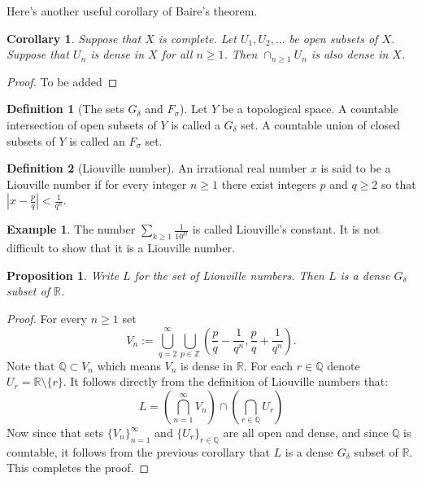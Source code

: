 \documentclass[11pt,a4paper]{article}
\theoremstyle{definition}
\newtheorem{definition}{Definition}[section]
\newtheorem{example}{Example}[section]
\theoremstyle{plain}
\newtheorem{proposition}[theorem]{Proposition}
\newtheorem{corollary}[theorem]{Corollary}
\newcommand{\Z}{\mathbb{Z}}
\newcommand{\Q}{\mathbb{Q}}
\newcommand{\R}{\mathbb{R}}
\newcommand{\abs}[1]{\left\lvert #1\right\rvert}
\begin{document}
  Here's another useful corollary of Baire's theorem.
  
  \begin{corollary}
    Suppose that $X$ is complete. Let $U_1,U_2,\dots$ be open subsets of $X$.
    Suppose that $U_n$ is dense in $X$ for all $n \geq 1$. Then 
    $\cap_{n \geq 1}{U_n}$ is also dense in $X$.
  \end{corollary}
  \begin{proof}
    To be added
  \end{proof}
  
  \begin{definition}[The sets $G_\delta$ and $F_\sigma$]
    Let $Y$ be a topological space. A countable intersection of open
    subsets of $Y$ is called a $G_\delta$ set. A countable union of closed 		
    subsets of $Y$ is called an $F_\sigma$ set.
  \end{definition}

  \begin{definition}[Liouville number]
    An irrational real number $x$ is said to be a Liouville number if
    for every integer $n \geq 1$ there exist integers $p$ and $q \geq 2$ 
    so that $\abs{x - \frac{p}{q}} < \frac{1}{q^n}$.
  \end{definition}

  \begin{example}
    The number $\sum_{k \geq 1}{\frac{1}{10^{k!}}}$ is called Liouville’s 
    constant. It is not difficult to show that it is a Liouville number.
  \end{example}

  \begin{proposition}
    Write $L$ for the set of Liouville numbers. Then $L$ is a dense
    $G_\delta$ subset of $\R$.
  \end{proposition}
  \begin{proof}
    For every $n \geq 1$ set
    \[
      V_n := \bigcup_{q=2}^{\infty} \bigcup_{p \in \Z}
      \left(\frac{p}{q} - \frac{1}{q^n},\frac{p}{q} + \frac{1}{q^n}\right).
    \]
    Note that $\Q \subset V_n$ which means $V_n$ is dense in $\R$. For each
    $r \in \Q$ denote $U_r = \R \setminus \{r\}$. It follows directly from
    the definition of Liouville numbers that:
    \[
      L = \left(\bigcap_{n=1}^{\infty}{V_n}\right) \cap
        \left(\bigcap_{r \in \Q}{U_r}\right)
    \]
    Now since that sets $\{V_n\}_{n=1}^{\infty}$ and $\{U_r\}_{r \in \Q}$
    are all open and dense, and since $\Q$ is countable, it follows from
    the previous corollary that $L$ is a dense $G_\delta$ subset of $\R$.
    This completes the proof.
  \end{proof}
\end{document}
